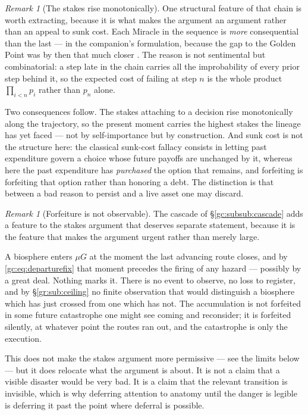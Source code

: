 \documentclass[11pt]{article}
\numberwithin{equation}{section}
\theoremstyle{plain}
\theoremstyle{definition}
\theoremstyle{remark}
\newtheorem{remark}[theorem]{Remark}
\begin{document}
\begin{remark}[The stakes rise monotonically]\label{hr:rem:monotone}
One structural feature of that chain is worth extracting, because it is
what makes the argument an argument rather than an appeal to sunk cost.
Each Miracle in the sequence is \emph{more} consequential than the last
--- in the companion's formulation, because the gap to the Golden Point
was by then that much closer \cite{Nexus}. The reason is not sentimental
but combinatorial: a step late in the chain carries all the improbability
of every prior step behind it, so the expected cost of failing at step
$n$ is the whole product $\prod_{i<n}p_i$ rather than $p_n$ alone.

Two consequences follow. The stakes attaching to a decision rise
monotonically along the trajectory, so the present moment carries the
highest stakes the lineage has yet faced --- not by self-importance but
by construction. And sunk cost is not the structure here: the classical
sunk-cost fallacy consists in letting past expenditure govern a choice
whose future payoffs are unchanged by it, whereas here the past
expenditure has \emph{purchased} the option that remains, and forfeiting
is forfeiting that option rather than honoring a debt. The distinction
is that between a bad reason to persist and a live asset one may
discard.
\end{remark}

\begin{remark}[Forfeiture is not observable]\label{hr:rem:silentforfeit}
The cascade of \S\ref{gc:subsub:cascade} adds a feature to the stakes
argument that deserves separate statement, because it is the feature
that makes the argument urgent rather than merely large.

A biosphere enters $\mu G$ at the moment the last advancing route
closes, and by \eqref{gc:eq:departurefix} that moment precedes the
firing of any hazard --- possibly by a great deal. Nothing marks it.
There is no event to observe, no loss to register, and by
\S\ref{gr:sub:ceiling} no finite observation that would distinguish a
biosphere which has just crossed from one which has not. The
accumulation is not forfeited in some future catastrophe one might see
coming and reconsider; it is forfeited silently, at whatever point the
routes ran out, and the catastrophe is only the execution.

This does not make the stakes argument more permissive --- see the
limits below --- but it does relocate what the argument is about. It is
not a claim that a visible disaster would be very bad. It is a claim
that the relevant transition is invisible, which is why deferring
attention to anatomy until the danger is legible is deferring it past
the point where deferral is possible.
\end{remark}
\end{document}
